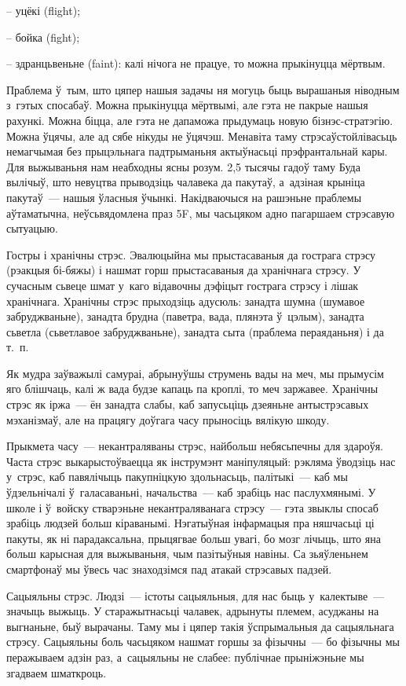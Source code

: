 – уцёкі (flight);

– бойка (fight);

– здранцьвеньне (faint): калі нічога не працуе, то можна прыкінуцца мёртвым.

Праблема ў~тым, што цяпер нашыя задачы ня могуць быць вырашаныя ніводным з~гэтых спосабаў. Можна прыкінуцца мёртвымі, але гэта не пакрые нашыя рахункі. Можна біцца, але гэта не дапаможа прыдумаць новую бізнэс-стратэгію. Можна ўцячы, але ад сябе нікуды не ўцячэш. Менавіта таму стрэсаўстойлівасьць немагчымая без прыцэльнага падтрыманьня актыўнасьці прэфрантальнай кары. Для выжываньня нам неабходны ясны розум. 2,5 тысячы гадоў таму Буда вылічыў, што невуцтва прыводзіць чалавека да пакутаў, а~адзіная крыніца пакутаў~--- нашыя ўласныя ўчынкі. Накідваючыся на рашэньне праблемы аўтаматычна, неўсьвядомлена праз 5F, мы часьцяком адно пагаршаем стрэсавую сытуацыю.

Гостры і хранічны стрэс. Эвалюцыйна мы прыстасаваныя да гострага стрэсу (рэакцыя бі-бяжы) і нашмат горш прыстасаваныя да хранічнага стрэсу. У сучасным сьвеце шмат у~каго відавочны дэфіцыт гострага стрэсу і лішак хранічнага. Хранічны стрэс прыходзіць адусюль: занадта шумна (шумавое забруджваньне), занадта брудна (паветра, вада, плянэта ў~цэлым), занадта сьветла (сьветлавое забруджваньне), занадта сыта (праблема пераяданьня) і да т.~п.

Як мудра заўважылі самураі, абрынуўшы струмень вады на меч, мы прымусім яго блішчаць, калі ж вада будзе капаць па кроплі, то меч заржавее. Хранічны стрэс як іржа~--- ён занадта слабы, каб запусьціць дзеяньне антыстрэсавых мэханізмаў, але на працягу доўгага часу прыносіць вялікую шкоду.

Прыкмета часу~--- некантраляваны стрэс, найбольш небясьпечны для здароўя. Часта стрэс выкарыстоўваецца як інструмэнт маніпуляцый: рэкляма ўводзіць нас у~стрэс, каб павялічыць пакупніцкую здольнасьць, палітыкі~--- каб мы ўдзельнічалі ў~галасаваньні, начальства~--- каб зрабіць нас паслухмянымі. У школе і ў~войску стварэньне некантраляванага стрэсу~--- гэта звыклы спосаб зрабіць людзей больш кіраванымі. Нэгатыўная інфармацыя пра няшчасьці ці пакуты, як ні парадаксальна, прыцягвае больш увагі, бо мозг лічыць, што яна больш карысная для выжываньня, чым пазітыўныя навіны. Са зьяўленьнем смартфонаў мы ўвесь час знаходзімся пад атакай стрэсавых падзей.

Сацыяльны стрэс. Людзі~--- істоты сацыяльныя, для нас быць у~калектыве~--- значыць выжыць. У старажытнасьці чалавек, адрынуты племем, асуджаны на выгнаньне, быў вырачаны. Таму мы і цяпер такія ўспрымальныя да сацыяльнага стрэсу. Сацыяльны боль часьцяком нашмат горшы за фізычны~--- бо фізычны мы перажываем адзін раз, а~сацыяльны не слабее: публічнае прыніжэньне мы згадваем шматкроць.

